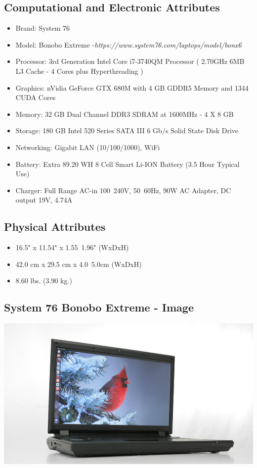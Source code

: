 \documentclass{article}
\begin{document}
\subsection{Computational and Electronic Attributes}
\begin{itemize}
\item Brand: System 76
\item Model: Bonobo Extreme -\textit{https://www.system76.com/laptops/model/bonx6}
\item Processor: 3rd Generation Intel Core i7-3740QM Processor ( 2.70GHz 6MB L3 Cache - 4 Cores plus Hyperthreading ) 
\item Graphics: nVidia GeForce GTX 680M with 4 GB GDDR5 Memory and 1344 CUDA Cores
\item Memory: 32 GB Dual Channel DDR3 SDRAM at 1600MHz - 4 X 8 GB
\item Storage: 180 GB Intel 520 Series SATA III 6 Gb/s Solid State Disk Drive
\item Networking: Gigabit LAN (10/100/1000), WiFi
\item Battery: Extra 89.20 WH 8 Cell Smart Li-ION Battery (3.5 Hour Typical Use)
\item Charger: Full Range AC-in 100~240V, 50~60Hz, 90W AC Adapter, DC output 19V, 4.74A
\end{itemize}

\subsection{Physical Attributes}
\begin{itemize}
\item 16.5" x 11.54" x 1.55~1.96" (WxDxH)
\item 42.0 cm x 29.5 cm x 4.0~5.0cm (WxDxH)
\item 8.60 lbs. (3.90 kg.)
\end{itemize}

\subsection{System 76 Bonobo Extreme - Image}
\begin{center}
\includegraphics[width=0.75\columnwidth]{./pix/system76.jpg}
\end{center}
\end{document}

